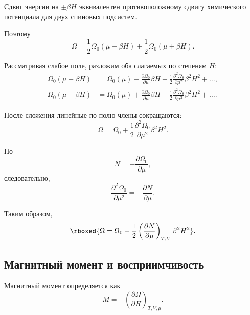 \documentclass[../final.tex]{subfiles}
\begin{document}
Сдвиг энергии на $\pm\beta H$ эквивалентен противоположному
сдвигу химического потенциала для двух спиновых подсистем.

Поэтому
%
\begin{equation*}
    \Omega
    =
    \frac{1}{2}
    \Omega_0(\mu-\beta H)
    +
    \frac{1}{2}
    \Omega_0(\mu+\beta H).
\end{equation*}

Рассматривая слабое поле, разложим оба слагаемых по степеням $H$:
%
\begin{align*}
    \Omega_0(\mu-\beta H)
    &=
    \Omega_0(\mu)
    -
    \frac{\partial\Omega_0}{\partial\mu}
    \beta H
    +
    \frac{1}{2}
    \frac{\partial^2\Omega_0}{\partial\mu^2}
    \beta^2H^2
    +
    \ldots,
    \\[6pt]
    \Omega_0(\mu+\beta H)
    &=
    \Omega_0(\mu)
    +
    \frac{\partial\Omega_0}{\partial\mu}
    \beta H
    +
    \frac{1}{2}
    \frac{\partial^2\Omega_0}{\partial\mu^2}
    \beta^2H^2
    +
    \ldots.
\end{align*}

После сложения линейные по полю члены сокращаются:
%
\begin{equation*}
    \Omega
    =
    \Omega_0
    +
    \frac{1}{2}
    \frac{\partial^2\Omega_0}{\partial\mu^2}
    \beta^2H^2.
\end{equation*}

Но
%
\begin{equation*}
    N
    =
    -
    \frac{\partial\Omega_0}{\partial\mu},
\end{equation*}
%
следовательно,
%
\begin{equation*}
    \frac{\partial^2\Omega_0}{\partial\mu^2}
    =
    -
    \frac{\partial N}{\partial\mu}.
\end{equation*}

Таким образом,
%
\[
    \rboxed{
        \Omega
        =
        \Omega_0
        -
        \frac{1}{2}
        \left(
            \frac{\partial N}{\partial\mu}
        \right)_{T,V}
        \beta^2H^2
    }.
\]


\subsection{Магнитный момент и восприимчивость}

Магнитный момент определяется как
%
\begin{equation*}
    M
    =
    -
    \left(
        \frac{\partial\Omega}{\partial H}
    \right)_{T,V,\mu}.
\end{equation*}
\end{document}
